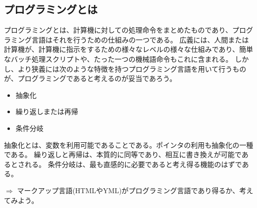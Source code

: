 \subsection{プログラミングとは}
プログラミングとは、計算機に対しての処理命令をまとめたものであり、プログラミング言語はそれを行うための仕組みの一つである。
広義には、人間または計算機が、計算機に指示をするための様々なレベルの様々な仕組みであり、簡単なバッチ処理スクリプトや、たった一つの機械語命令もこれに含まれる。
しかし、より狭義には次のような特徴を持つプログラミング言語を用いて行うものが、プログラミングであると考えるのが妥当であろう。
\begin{itemize}
  \item 抽象化
  \item 繰り返しまたは再帰
  \item 条件分岐
\end{itemize}
抽象化とは、変数を利用可能であることである。ポインタの利用も抽象化の一種である。
繰り返しと再帰は、本質的に同等であり、相互に書き換えが可能であるとされる。
条件分岐は、最も直感的に必要であると考え得る機能のはずである。
\begin{breakbox}$\Rightarrow$
マークアップ言語(HTMLやYML)がプログラミング言語であり得るか、考えてみよう。
\end{breakbox}


